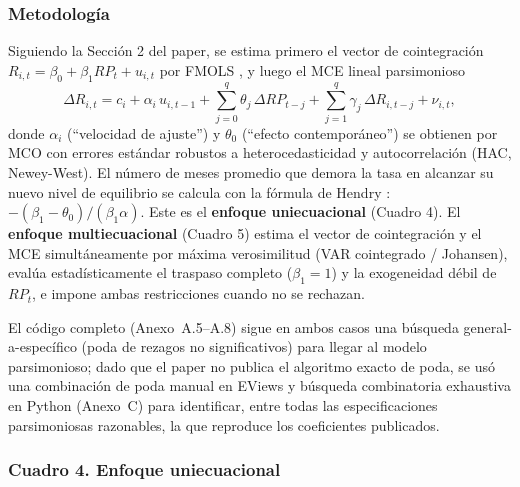 \documentclass[12pt, letterpaper]{article}
\begin{document}
\subsubsection{Metodología}

Siguiendo la Sección 2 del paper, se estima primero el vector de
cointegración $R_{i,t} = \beta_0 + \beta_1 RP_t + u_{i,t}$ por FMOLS
\parencite{phillips1990}, y luego el MCE lineal parsimonioso
\begin{equation}
  \Delta R_{i,t} = c_i + \alpha_i\, u_{i,t-1}
  + \sum_{j=0}^{q}\theta_j\,\Delta RP_{t-j}
  + \sum_{j=1}^{q}\gamma_j\,\Delta R_{i,t-j} + \nu_{i,t},
\end{equation}
donde $\alpha_i$ (``velocidad de ajuste'') y $\theta_0$ (``efecto
contemporáneo'') se obtienen por MCO con errores estándar
robustos a heterocedasticidad y autocorrelación (HAC, Newey-West). El
número de meses promedio que demora la tasa en alcanzar su nuevo nivel
de equilibrio se calcula con la fórmula de Hendry \parencite{hendry1995}:
$-(\beta_1-\theta_0)/(\beta_1\alpha)$. Este es el \textbf{enfoque
uniecuacional} (Cuadro 4). El \textbf{enfoque multiecuacional}
(Cuadro 5) estima el vector de cointegración y el MCE simultáneamente
por máxima verosimilitud (VAR cointegrado / Johansen), evalúa
estadísticamente el traspaso completo ($\beta_1=1$) y la exogeneidad
débil de $RP_t$, e impone ambas restricciones cuando no se rechazan.

El código completo (Anexo~A.5--A.8) sigue en ambos casos una búsqueda
general-a-específico (poda de rezagos no significativos) para llegar al
modelo parsimonioso; dado que el paper no publica el algoritmo exacto
de poda, se usó una combinación de poda manual en EViews y búsqueda
combinatoria exhaustiva en Python (Anexo~C) para identificar, entre
todas las especificaciones parsimoniosas razonables, la que reproduce
los coeficientes publicados.

\subsubsection{Cuadro 4. Enfoque uniecuacional}
\end{document}
